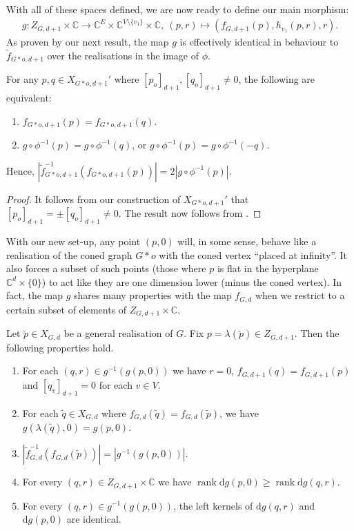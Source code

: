 \documentclass[ALCO]{cedram}
\DeclareMathOperator{\rank}{rank}
\newcommand{\diff}{\mathrm{d}}
\begin{document}
With all of these spaces defined,
we are now ready to define our main morphism:
\begin{align*}
	g : Z_{G,d+1} \times \mathbb{C} \rightarrow \mathbb{C}^E \times \mathbb{C}^{V \setminus \{v_1\}} \times \mathbb{C} , ~ (p,r) \mapsto \left( f_{G,d+1}(p) , h_{v_1}(p,r), r \right).
\end{align*}
As proven by our next result,
the map $g$ is effectively identical in behaviour to $\tilde{f}_{G*o,d+1}$ over the realisations in the image of $\phi$.

\begin{lemma}\label{l:gmap}
	For any $p,q \in X_{G*o,d+1}'$ where $[p_o]_{d+1}, [q_o]_{d+1} \neq 0$,
	the following are equivalent:
	\begin{enumerate}
		\item $f_{G*o,d+1} (p) = f_{G*o,d+1} (q)$.
		\item $g \circ \phi^{-1}(p) = g \circ \phi^{-1}(q)$, or $g \circ \phi^{-1}(p) = g \circ \phi^{-1}(-q)$.
	\end{enumerate}
	Hence, $|\tilde{f}_{G*o,d+1}^{-1}(f_{G*o,d+1} (p))| = 2|g \circ \phi^{-1}(p)|$.
\end{lemma}

\begin{proof}
	It follows from our construction of $X_{G*o,d+1}'$ that $[p_o]_{d+1} = \pm [q_o]_{d+1} \neq 0$.
	The result now follows from .
\end{proof}

With our new set-up,
any point $(p,0)$ will, in some sense, behave like a realisation of the coned graph $G*o$ with the coned vertex ``placed at infinity''.
It also forces a subset of such points (\ie those where $p$ is flat in the hyperplane $\mathbb{C}^d \times \{0\}$) to act like they are one dimension lower (minus the coned vertex).
In fact,
the map $g$ shares many properties with the map $f_{G,d}$ when we restrict to a certain subset of elements of $Z_{G,d+1} \times \mathbb{C}$.


\begin{lemma}\label{l:gmapflat}
	Let $\tilde{p} \in X_{G,d}$ be a general realisation of $G$.
	Fix $p = \lambda(\tilde{p}) \in Z_{G,d+1}$.
	Then the following properties hold.
	\begin{enumerate}
		\item \label{l:gmapflat1} For each $(q,r) \in g^{-1}(g(p,0))$ we have $r = 0$, $f_{G,d+1}(q)=f_{G,d+1}(p)$ and $[q_v]_{d+1}=0$ for each $v \in V$.
		\item \label{l:gmapflat2} For each $\tilde{q} \in X_{G,d}$ where $f_{G,d}(\tilde{q}) = f_{G,d}(\tilde{p})$,
		we have $g(\lambda(\tilde{q}),0) = g(p,0)$.
		\item \label{l:gmapflat3} $|\tilde{f}_{G,d}^{-1}(f_{G,d}(\tilde{p}))| = |g^{-1}(g(p,0))|$.
		\item \label{l:gmapflat4} For every $(q,r) \in Z_{G,d+1} \times \mathbb{C}$ we have $\rank \diff g(p,0) \geq \rank \diff g(q,r)$.
		\item \label{l:gmapflat5} For every $(q,r) \in g^{-1}(g(p,0))$,
		the left kernels of $\diff g(q,r)$ and $\diff g(p,0)$ are identical.
	\end{enumerate}
\end{lemma}
\end{document}
